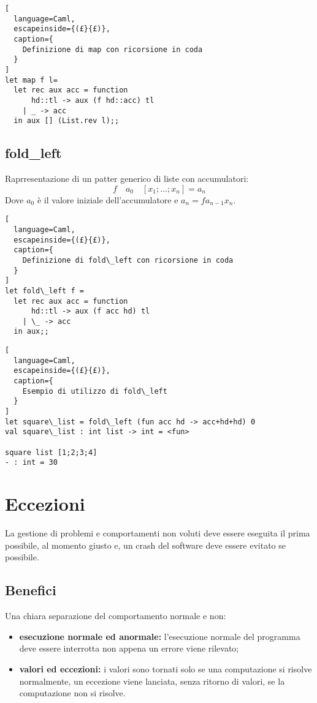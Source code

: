 \begin{lstlisting}[
  language=Caml,
  escapeinside={(£}{£)},
  caption={
    Definizione di map con ricorsione in coda
  }
]
let map f l=
  let rec aux acc = function
      hd::tl -> aux (f hd::acc) tl
    | _ -> acc
  in aux [] (List.rev l);;
\end{lstlisting}

\subsection{fold\_left}
Raprresentazione di un patter generico di liste con accumulatori:
\[
  f \quad a_0 \quad [x_1;\dots;x_n] = a_n
\]
Dove $a_0$ è il valore iniziale dell'accumulatore e $a_n=fa_{n-1}x_n$.

\begin{lstlisting}[
  language=Caml,
  escapeinside={(£}{£)},
  caption={
    Definizione di fold\_left con ricorsione in coda
  }
]
let fold\_left f =
  let rec aux acc = function
      hd::tl -> aux (f acc hd) tl
    | \_ -> acc
  in aux;;
\end{lstlisting}

\begin{lstlisting}[
  language=Caml,
  escapeinside={(£}{£)},
  caption={
    Esempio di utilizzo di fold\_left
  }
]
let square\_list = fold\_left (fun acc hd -> acc+hd+hd) 0
val square\_list : int list -> int = <fun>

square list [1;2;3;4]
- : int = 30
\end{lstlisting}

\section{Eccezioni}
La gestione di problemi e comportamenti non voluti deve essere eseguita il
prima possibile, al momento giusto e, un crash del software deve essere
evitato se possibile.

\subsection{Benefici}
Una chiara separazione del comportamento normale e non:
\begin{itemize}
  \item \textbf{esecuzione normale ed anormale:} l'esecuzione normale del
    programma deve essere interrotta non appena un errore viene rilevato;
  \item \textbf{valori ed eccezioni:} i valori sono tornati solo se una
    computazione si risolve normalmente, un eccezione viene lanciata, senza
    ritorno di valori, se la computazione non si risolve.
\end{itemize}


